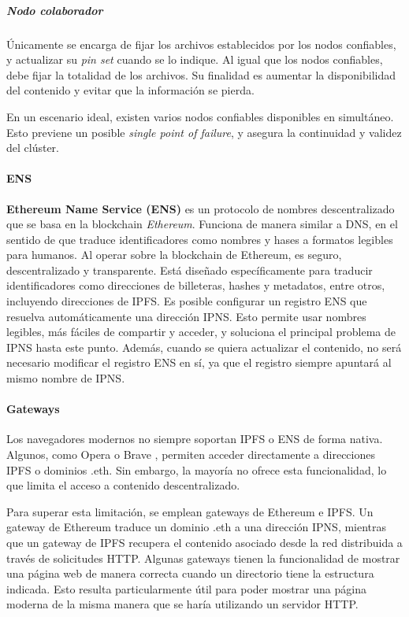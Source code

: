 \subparagraph{Nodo colaborador} Únicamente se encarga de fijar los archivos establecidos por los nodos confiables, y actualizar su \textit{pin set} cuando se lo indique. Al igual que los nodos confiables, debe fijar la totalidad de los archivos. Su finalidad es aumentar la disponibilidad del contenido y evitar que la información se pierda.

En un escenario ideal, existen varios nodos confiables disponibles en simultáneo. Esto previene un posible \textit{single point of failure}, y asegura la continuidad y validez del clúster.

\paragraph{ENS} \textbf{Ethereum Name Service (ENS)} \cite{ens} es un protocolo de nombres descentralizado que se basa en la blockchain \textit{Ethereum}. Funciona de manera similar a DNS, en el sentido de que traduce identificadores como nombres y hases a formatos legibles para humanos. Al operar sobre la blockchain de Ethereum, es seguro, descentralizado y transparente. Está diseñado específicamente para traducir identificadores como direcciones de billeteras, hashes y metadatos, entre otros, incluyendo direcciones de IPFS. Es posible configurar un registro ENS que resuelva automáticamente una dirección IPNS. Esto permite usar nombres legibles, más fáciles de compartir y acceder, y soluciona el principal problema de IPNS hasta este punto. Además, cuando se quiera actualizar el contenido, no será necesario modificar el registro ENS en sí, ya que el registro siempre apuntará al mismo nombre de IPNS.

\paragraph{Gateways} Los navegadores modernos no siempre soportan IPFS o ENS de forma nativa. Algunos, como Opera \cite{opera-ipfs} o Brave \cite{brave-ipfs}, permiten acceder directamente a direcciones IPFS o dominios .eth. Sin embargo, la mayoría no ofrece esta funcionalidad, lo que limita el acceso a contenido descentralizado.

Para superar esta limitación, se emplean gateways de Ethereum e IPFS. Un gateway de Ethereum traduce un dominio .eth a una dirección IPNS, mientras que un gateway de IPFS recupera el contenido asociado desde la red distribuida a través de solicitudes HTTP. Algunas gateways tienen la funcionalidad de mostrar una página web de manera correcta cuando un directorio tiene la estructura indicada. Esto resulta particularmente útil para poder mostrar una página moderna de la misma manera que se haría utilizando un servidor HTTP.

